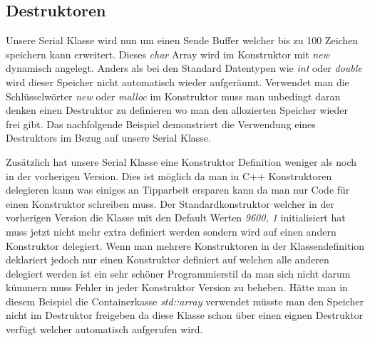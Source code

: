 \documentclass[MES,Master,ngerman]{twbook}%
\begin{document}
\subsection{Destruktoren}
Unsere Serial Klasse wird nun um einen Sende Buffer welcher bis zu 100 Zeichen speichern kann erweitert. Dieses \textit{char} Array wird im Konstruktor mit \textit{new} dynamisch angelegt. Anders als bei den Standard Datentypen wie \textit{int} oder \textit{double} wird dieser Speicher nicht automatisch wieder aufgeräumt. Verwendet man die Schlüsselwörter \textit{new} oder \textit{malloc} im Konstruktor muss man unbedingt daran denken einen Destruktor zu definieren wo man den allozierten Speicher wieder frei gibt. Das nachfolgende Beispiel demonstriert die Verwendung eines Destruktors im Bezug auf unsere Serial Klasse.  

\begin{figure}[!htb]
	\begin{subfigure}[b]{0.5\textwidth}
		
		\label{fig:28}
	\end{subfigure}
	\begin{subfigure}[b]{0.5\textwidth}
		
		\label{fig:29}
	\end{subfigure}
\end{figure}

Zusätzlich hat unsere Serial Klasse eine Konstruktor Definition weniger als noch in der vorherigen Version. Dies ist möglich da man in C++ Konstruktoren delegieren kann was einiges an Tipparbeit ersparen kann da man nur Code für einen Konstruktor schreiben muss. Der Standardkonstruktor welcher in der vorherigen Version die Klasse mit den Default Werten \textit{9600, 1} initialisiert hat muss jetzt nicht mehr extra definiert werden sondern wird auf einen andern Konstruktor delegiert. Wenn man mehrere Konstruktoren in der Klassendefinition deklariert jedoch nur einen Konstruktor definiert auf welchen alle anderen delegiert werden ist ein sehr schöner Programmierstil da man sich nicht darum kümmern muss Fehler in jeder Konstruktor Version zu beheben. Hätte man in diesem Beispiel die Containerkasse \textit{std::array} verwendet müsste man den Speicher nicht im Destruktor freigeben da diese Klasse schon über einen eignen Destruktor verfügt welcher automatisch aufgerufen wird.
\end{document}
